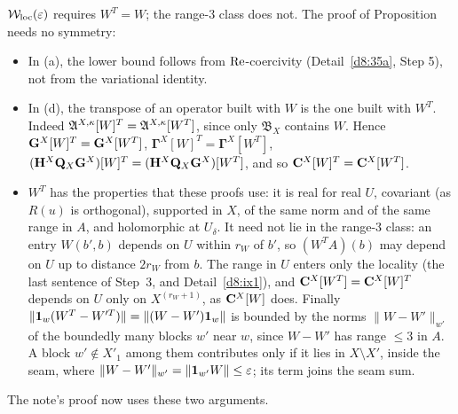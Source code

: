 \begin{detail}
\begin{step}
\end{step}
\begin{step}
$\mathcal W_{\rm loc}(\varepsilon)$ requires $W^T=W$; the range-$3$ class does not. The proof of Proposition~ needs no symmetry:
\begin{itemize}
\item In (a), the lower bound follows from $\operatorname{Re}$-coercivity (Detail~\ref{d8:35a}, Step 5), not from the variational identity.
\item In (d), the transpose of an operator built with $W$ is the one built with $W^T$. Indeed $\mathfrak A^{X,\kappa}[W]^T=\mathfrak A^{X,\kappa}[W^T]$, since only $\mathfrak B_X$ contains $W$. Hence $\mathbf G^X[W]^T=\mathbf G^X[W^T]$, $\boldsymbol\Gamma^X[W]^T=\boldsymbol\Gamma^X[W^T]$, $(\mathbf H^X\mathbf Q_X\mathbf G^X)[W]^T=(\mathbf H^X\mathbf Q_X\mathbf G^X)[W^T]$, and so $\mathbf C^X[W]^T=\mathbf C^X[W^T]$.
\item $W^T$ has the properties that these proofs use: it is real for real $U$, covariant (as $R(u)$ is orthogonal), supported in $X$, of the same norm and of the same range in $A$, and holomorphic at $U_\delta$. It need not lie in the range-$3$ class: an entry $W(b',b)$ depends on $U$ within $r_W$ of $b'$, so $(W^TA)(b)$ may depend on $U$ up to distance $2r_W$ from $b$. The range in $U$ enters only the locality (the last sentence of Step~3, and Detail~\ref{d8:ix1}), and $\mathbf C^X[W^T]=\mathbf C^X[W]^T$ depends on $U$ only on $X^{(r_W+1)}$, as $\mathbf C^X[W]$ does. Finally $\|\mathbf 1_w(W^T-W'^T)\|=\|(W-W')\mathbf 1_w\|$ is bounded by the norms $\|W-W'\|_{w'}$ of the boundedly many blocks $w'$ near $w$, since $W-W'$ has range $\le3$ in $A$. A block $w'\notin X'_1$ among them contributes only if it lies in $X\setminus X'$, inside the seam, where $\|W-W'\|_{w'}=\|\mathbf 1_{w'}W\|\le\varepsilon$; its term joins the seam sum.
\end{itemize}
The note's proof now uses these two arguments.
\end{step}
\end{detail}


